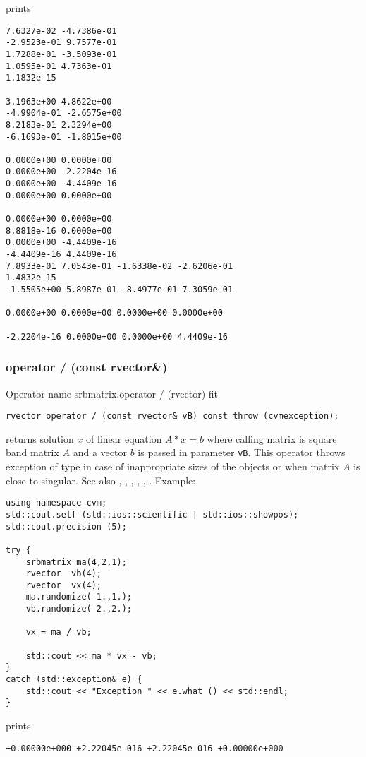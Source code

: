 prints
\begin{Verbatim}
7.6327e-02 -4.7386e-01
-2.9523e-01 9.7577e-01
1.7288e-01 -3.5093e-01
1.0595e-01 4.7363e-01
1.1832e-15

3.1963e+00 4.8622e+00
-4.9904e-01 -2.6575e+00
8.2183e-01 2.3294e+00
-6.1693e-01 -1.8015e+00

0.0000e+00 0.0000e+00
0.0000e+00 -2.2204e-16
0.0000e+00 -4.4409e-16
0.0000e+00 0.0000e+00

0.0000e+00 0.0000e+00
8.8818e-16 0.0000e+00
0.0000e+00 -4.4409e-16
-4.4409e-16 4.4409e-16
7.8933e-01 7.0543e-01 -1.6338e-02 -2.6206e-01
1.4832e-15
-1.5505e+00 5.8987e-01 -8.4977e-01 7.3059e-01

0.0000e+00 0.0000e+00 0.0000e+00 0.0000e+00

-2.2204e-16 0.0000e+00 0.0000e+00 4.4409e-16
\end{Verbatim}
\newpage


\subsubsection{operator / (const rvector\&)}
Operator%
\pdfdest name {srbmatrix.operator / (rvector)} fit
\begin{verbatim}
rvector operator / (const rvector& vB) const throw (cvmexception);
\end{verbatim}
returns solution $x$ of linear equation
$A*x=b$ where calling matrix is square band matrix $A$
and a vector $b$ is passed in parameter \verb"vB".
This operator throws exception 
of type 
in case of inappropriate sizes
of the objects or when  matrix $A$ is close to singular.
See also , 
, 
, 
, , .
Example:
\begin{Verbatim}
using namespace cvm;
std::cout.setf (std::ios::scientific | std::ios::showpos);
std::cout.precision (5);

try {
    srbmatrix ma(4,2,1);
    rvector  vb(4);
    rvector  vx(4);
    ma.randomize(-1.,1.);
    vb.randomize(-2.,2.);

    vx = ma / vb;

    std::cout << ma * vx - vb;
}
catch (std::exception& e) {
    std::cout << "Exception " << e.what () << std::endl;
}
\end{Verbatim}
prints
\begin{Verbatim}
+0.00000e+000 +2.22045e-016 +2.22045e-016 +0.00000e+000
\end{Verbatim}
\newpage




